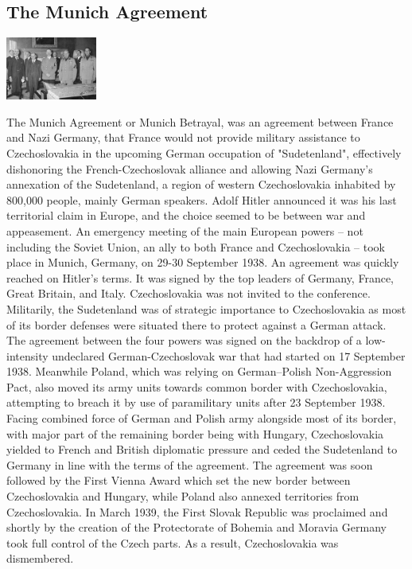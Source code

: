 \documentclass[11pt]{report}
\begin{document}
\subsection{The Munich Agreement}
\vspace{2mm}\begin{center}\includegraphics[width=3cm]{./img/munichAgreement.jpg}\end{center}
The Munich Agreement or Munich Betrayal, was an agreement between France and Nazi Germany, that France would not provide military assistance to Czechoslovakia in the upcoming German occupation of "Sudetenland", effectively dishonoring the French-Czechoslovak alliance and allowing Nazi Germany's annexation of the Sudetenland, a region of western Czechoslovakia inhabited by 800,000 people, mainly German speakers. Adolf Hitler announced it was his last territorial claim in Europe, and the choice seemed to be between war and appeasement. An emergency meeting of the main European powers – not including the Soviet Union, an ally to both France and Czechoslovakia – took place in Munich, Germany, on 29-30 September 1938. An agreement was quickly reached on Hitler's terms. It was signed by the top leaders of Germany, France, Great Britain, and Italy. Czechoslovakia was not invited to the conference. Militarily, the Sudetenland was of strategic importance to Czechoslovakia as most of its border defenses were situated there to protect against a German attack. The agreement between the four powers was signed on the backdrop of a low-intensity undeclared German-Czechoslovak war that had started on 17 September 1938. Meanwhile Poland, which was relying on German–Polish Non-Aggression Pact, also moved its army units towards common border with Czechoslovakia, attempting to breach it by use of paramilitary units after 23 September 1938. Facing combined force of German and Polish army alongside most of its border, with major part of the remaining border being with Hungary, Czechoslovakia yielded to French and British diplomatic pressure and ceded the Sudetenland to Germany in line with the terms of the agreement. The agreement was soon followed by the First Vienna Award which set the new border between Czechoslovakia and Hungary, while Poland also annexed territories from Czechoslovakia. In March 1939, the First Slovak Republic was proclaimed and shortly by the creation of the Protectorate of Bohemia and Moravia Germany took full control of the Czech parts. As a result, Czechoslovakia was dismembered.
\end{document}
